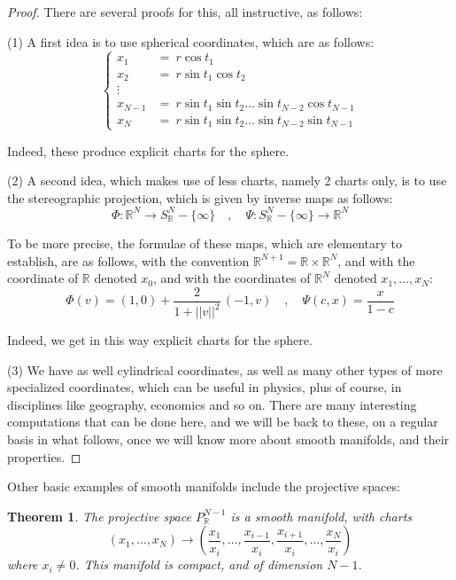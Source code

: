 \documentclass[12pt]{amsbook}
\newtheorem{theorem}{Theorem}[chapter]
\begin{document}
\begin{proof}
There are several proofs for this, all instructive, as follows:

\medskip

(1) A first idea is to use spherical coordinates, which are as follows:
$$\begin{cases}
x_1\!\!\!&=\ r\cos t_1\\
x_2\!\!\!&=\ r\sin t_1\cos t_2\\
\vdots\\
x_{N-1}\!\!\!&=\ r\sin t_1\sin t_2\ldots\sin t_{N-2}\cos t_{N-1}\\
x_N\!\!\!&=\ r\sin t_1\sin t_2\ldots\sin t_{N-2}\sin t_{N-1}
\end{cases}$$

Indeed, these produce explicit charts for the sphere.

\medskip

(2) A second idea, which makes use of less charts, namely 2 charts only, is to use the stereographic projection, which is given by inverse maps as follows:
$$\Phi:\mathbb R^N\to S^N_\mathbb R-\{\infty\}\quad,\quad 
\Psi:S^N_\mathbb R-\{\infty\}\to\mathbb R^N$$

To be more precise, the formulae of these maps, which are elementary to establish, are as follows, with the convention $\mathbb R^{N+1}=\mathbb R\times\mathbb R^N$, and with the coordinate of $\mathbb R$ denoted $x_0$, and with the coordinates of $\mathbb R^N$ denoted $x_1,\ldots,x_N$:
$$\Phi(v)=(1,0)+\frac{2}{1+||v||^2}\,(-1,v)\quad,\quad 
\Psi(c,x)=\frac{x}{1-c}$$

Indeed, we get in this way explicit charts for the sphere.

\medskip

(3) We have as well cylindrical coordinates, as well as many other types of more specialized coordinates, which can be useful in physics, plus of course, in disciplines like geography, economics and so on. There are many interesting computations that can be done here, and we will be back to these, on a regular basis in what follows, once we will know more about smooth manifolds, and their properties.
\end{proof}

Other basic examples of smooth manifolds include the projective spaces:

\begin{theorem}
The projective space $P^{N-1}_\mathbb R$ is a smooth manifold, with charts
$$(x_1,\ldots,x_N)\to\left(\frac{x_1}{x_i},\ldots,\frac{x_{i-1}}{x_i},\frac{x_{i+1}}{x_i},\ldots,\frac{x_N}{x_i}\right)$$
where $x_i\neq0$. This manifold is compact, and of dimension $N-1$.
\end{theorem}
\end{document}
